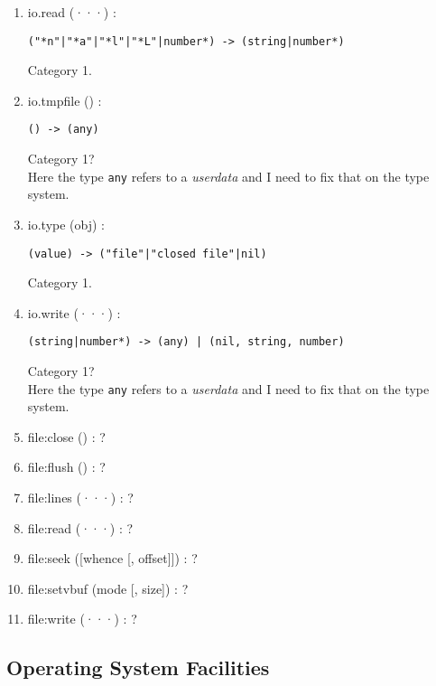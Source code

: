 \begin{enumerate}
\begin{verbatim}
(string, "r"|"w"|nil) -> (any) | (nil, string, number)
\end{verbatim}
Category 1?
\\
Here the type \texttt{any} refers to a \textit{userdata} and
I need to fix that on the type system.
\item io.read (···) :
\begin{verbatim}
("*n"|"*a"|"*l"|"*L"|number*) -> (string|number*)
\end{verbatim}
Category 1.
\item io.tmpfile () :
\begin{verbatim}
() -> (any)
\end{verbatim}
Category 1?
\\
Here the type \texttt{any} refers to a \textit{userdata} and
I need to fix that on the type system.
\item io.type (obj) :
\begin{verbatim}
(value) -> ("file"|"closed file"|nil)
\end{verbatim}
Category 1.
\item io.write (···) :
\begin{verbatim}
(string|number*) -> (any) | (nil, string, number)
\end{verbatim}
Category 1?
\\
Here the type \texttt{any} refers to a \textit{userdata} and
I need to fix that on the type system.
\item file:close () : ?
\item file:flush () : ?
\item file:lines (···) : ?
\item file:read (···) : ?
\item file:seek ([whence [, offset]]) : ?
\item file:setvbuf (mode [, size]) : ?
\item file:write (···) : ?
\end{enumerate}

\subsection{Operating System Facilities}

